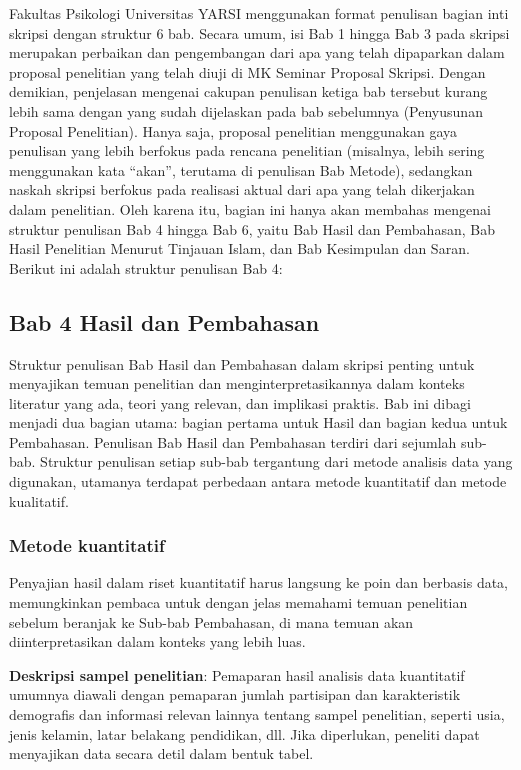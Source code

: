 \documentclass[
  indonesian,
  letterpaper,
]{scrbook}
\begin{document}
Fakultas Psikologi Universitas YARSI menggunakan format penulisan bagian
inti skripsi dengan struktur 6 bab. Secara umum, isi Bab 1 hingga Bab 3
pada skripsi merupakan perbaikan dan pengembangan dari apa yang telah
dipaparkan dalam proposal penelitian yang telah diuji di MK Seminar
Proposal Skripsi. Dengan demikian, penjelasan mengenai cakupan penulisan
ketiga bab tersebut kurang lebih sama dengan yang sudah dijelaskan pada
bab sebelumnya (Penyusunan Proposal Penelitian). Hanya saja, proposal
penelitian menggunakan gaya penulisan yang lebih berfokus pada rencana
penelitian (misalnya, lebih sering menggunakan kata ``akan'', terutama
di penulisan Bab Metode), sedangkan naskah skripsi berfokus pada
realisasi aktual dari apa yang telah dikerjakan dalam penelitian. Oleh
karena itu, bagian ini hanya akan membahas mengenai struktur penulisan
Bab 4 hingga Bab 6, yaitu Bab Hasil dan Pembahasan, Bab Hasil Penelitian
Menurut Tinjauan Islam, dan Bab Kesimpulan dan Saran. Berikut ini adalah
struktur penulisan Bab 4:

\subsection{Bab 4 Hasil dan
Pembahasan}\label{bab-4-hasil-dan-pembahasan}

Struktur penulisan Bab Hasil dan Pembahasan dalam skripsi penting untuk
menyajikan temuan penelitian dan menginterpretasikannya dalam konteks
literatur yang ada, teori yang relevan, dan implikasi praktis. Bab ini
dibagi menjadi dua bagian utama: bagian pertama untuk Hasil dan bagian
kedua untuk Pembahasan. Penulisan Bab Hasil dan Pembahasan terdiri dari
sejumlah sub-bab. Struktur penulisan setiap sub-bab tergantung dari
metode analisis data yang digunakan, utamanya terdapat perbedaan antara
metode kuantitatif dan metode kualitatif.

\subsubsection{Metode kuantitatif}\label{metode-kuantitatif}

Penyajian hasil dalam riset kuantitatif harus langsung ke poin dan
berbasis data, memungkinkan pembaca untuk dengan jelas memahami temuan
penelitian sebelum beranjak ke Sub-bab Pembahasan, di mana temuan akan
diinterpretasikan dalam konteks yang lebih luas.

\textbf{Deskripsi sampel penelitian}: Pemaparan hasil analisis data
kuantitatif umumnya diawali dengan pemaparan jumlah partisipan dan
karakteristik demografis dan informasi relevan lainnya tentang sampel
penelitian, seperti usia, jenis kelamin, latar belakang pendidikan, dll.
Jika diperlukan, peneliti dapat menyajikan data secara detil dalam
bentuk tabel.
\end{document}
